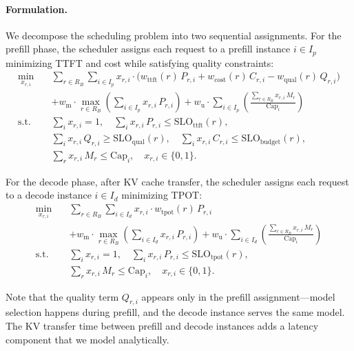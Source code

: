 \documentclass[letterpaper, anonymous, twocolumn, 10pt]{article}
\begin{document}
{\paragraph{Formulation.}
We decompose the scheduling problem into two sequential assignments.
For the prefill phase, the scheduler assigns each request to a prefill instance $i \in I_p$ minimizing TTFT and cost while satisfying quality constraints:
\begin{equation}
\begin{aligned}
\min_{x_{r,i}} \quad
& \sum_{r\in R_B}\sum_{i\in I_{p}} x_{r,i} \cdot \Big(w_{\text{ttft}}(r) \, P_{r,i} + w_{\text{cost}}(r) \, C_{r,i} - w_{\text{qual}}(r) \, Q_{r,i} \Big) \nonumber \\
& + w_{\text{m}} \cdot \max_{r \in R_B} \left( \sum_{i \in I_{p}} x_{r,i} \, P_{r,i} \right) \nonumber + w_{\text{u}} \cdot \sum_{i\in I_{p}}\left( \frac{\sum_{r\in R_B} x_{r,i} \, M_r}{\mathrm{Cap}_i}\right) \\
\text{s.t.}\quad
& \sum_{i} x_{r,i} = 1, \quad
\sum_{i} x_{r,i} \, P_{r,i} \le \mathrm{SLO}_{\text{ttft}}(r), \\
& \sum_{i} x_{r,i} \, Q_{r,i} \ge \mathrm{SLO}_{\text{qual}}(r), \quad
\sum_{i} x_{r,i} \, C_{r,i} \le \mathrm{SLO}_{\text{budget}}(r), \\
& \sum_{r} x_{r,i} \, M_r \le \mathrm{Cap}_i, \quad
x_{r,i} \in \{0,1\}.
\end{aligned}
\end{equation}

For the decode phase, after KV cache transfer, the scheduler assigns each request to a decode instance $i \in I_{d}$ minimizing TPOT:
\begin{equation}
\begin{aligned}
\min_{x_{r,i}} \quad
& \sum_{r\in R_B}\sum_{i\in I_{d}} x_{r,i} \cdot w_{\text{tpot}}(r) \, P_{r,i} \nonumber \\
& + w_{\text{m}} \cdot \max_{r \in R_B} \left( \sum_{i \in I_{d}} x_{r,i} \, P_{r,i} \right) \nonumber + w_{\text{u}} \cdot \sum_{i \in I_{d}}\left( \frac{\sum_{r\in R_B} x_{r,i} \, M_r}{\mathrm{Cap}_i}\right) \\
\text{s.t.}\quad
& \sum_{i} x_{r,i} = 1, \quad
\sum_{i} x_{r,i} \, P_{r,i} \le \mathrm{SLO}_{\text{tpot}}(r), \\
& \sum_{r} x_{r,i} \, M_r \le \mathrm{Cap}_i, \quad
x_{r,i} \in \{0,1\}.
\end{aligned}
\end{equation}

Note that the quality term $Q_{r,i}$ appears only in the prefill assignment---model selection happens during prefill, and the decode instance serves the same model.
The KV transfer time between prefill and decode instances adds a latency component that we model analytically.

}
\end{document}
